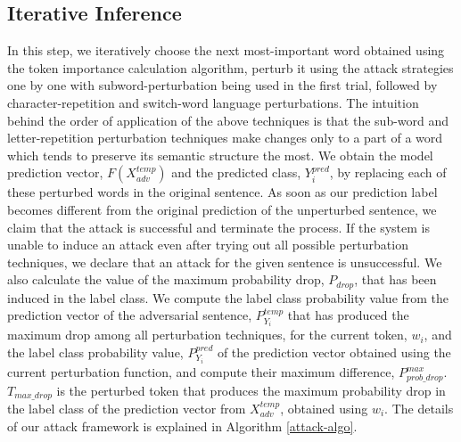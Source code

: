 \documentclass[sigconf]{acmart}
\begin{document}
\subsection{Iterative Inference}
In this step, we iteratively choose the next most-important word obtained using the token importance calculation algorithm, perturb it using the attack strategies one by one with subword-perturbation being used in the first trial, followed by character-repetition and switch-word language perturbations. The intuition behind the order of application of the above techniques is that the sub-word and letter-repetition perturbation techniques make changes only to a part of a word which tends to preserve its semantic structure the most. 
We obtain the model prediction vector, $F(X^{temp}_{adv})$ and the predicted class, $Y^{pred}_i$, by replacing each of these perturbed words in the original sentence. As soon as our prediction label becomes different from the original prediction of the unperturbed sentence, we claim that the attack is successful and terminate the process. If the system is unable to induce an attack even after trying out all possible perturbation techniques, we declare that an attack for the given sentence is unsuccessful. We also calculate the value of the maximum probability drop, $P_{drop}$, that has been induced in the label class.
We compute the label class probability value from the prediction vector of the adversarial sentence, $P^{temp}_{Y_i}$ that has produced the maximum drop among all perturbation techniques, for the current token, $w_i$, and the label class probability value, $P^{pred}_{Y_i}$ of the prediction vector obtained using the current perturbation function, and compute their maximum difference, $P^{ max}_{prob\_drop}$. $T_{max\_drop}$ is the perturbed token that produces the maximum probability drop in the label class of the prediction vector from ${X^{temp}_{adv}}$, obtained using $w_i$. The details of our attack framework is explained in Algorithm \ref{attack-algo}. 
\end{document}

